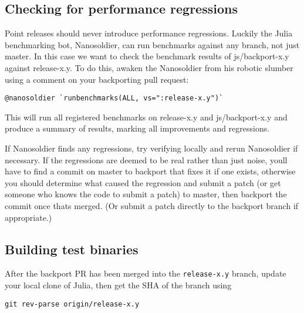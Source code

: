 \subsection{Checking for performance regressions}



Point releases should never introduce performance regressions. Luckily the Julia benchmarking bot, Nanosoldier, can run benchmarks against any branch, not just master. In this case we want to check the benchmark results of js/backport-x.y against release-x.y. To do this, awaken the Nanosoldier from his robotic slumber using a comment on your backporting pull request:




\begin{lstlisting}
@nanosoldier `runbenchmarks(ALL, vs=":release-x.y")`
\end{lstlisting}



This will run all registered benchmarks on release-x.y and js/backport-x.y and produce a summary of results, marking all improvements and regressions.



If Nanosoldier finds any regressions, try verifying locally and rerun Nanosoldier if necessary. If the regressions are deemed to be real rather than just noise, you{\textquotesingle}ll have to find a commit on master to backport that fixes it if one exists, otherwise you should determine what caused the regression and submit a patch (or get someone who knows the code to submit a patch) to master, then backport the commit once that{\textquotesingle}s merged. (Or submit a patch directly to the backport branch if appropriate.)



\hypertarget{11019808236351530595}{}


\subsection{Building test binaries}



After the backport PR has been merged into the \texttt{release-x.y} branch, update your local clone of Julia, then get the SHA of the branch using




\begin{lstlisting}
git rev-parse origin/release-x.y
\end{lstlisting}



